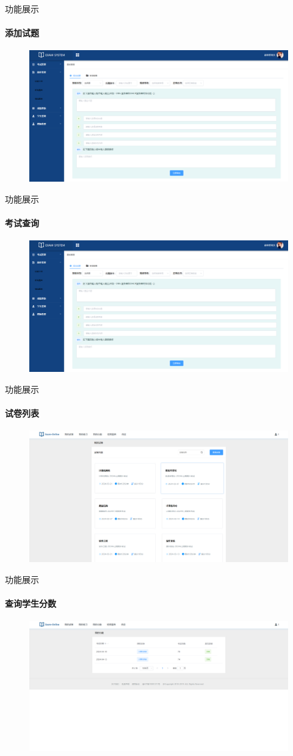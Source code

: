 \documentclass{beamer}
\begin{document}
\begin{frame}[fragile]{功能展示}
\framesubtitle{添加试题}
\begin{figure}
    \centering
    \includegraphics[width=0.75\linewidth]{2.png}
\end{figure}
\end{frame}

\begin{frame}[fragile]{功能展示}
\framesubtitle{考试查询}
\begin{figure}
    \centering
    \includegraphics[width=0.75\linewidth]{2.png}
\end{figure}
\end{frame}

\begin{frame}[fragile]{功能展示}
\framesubtitle{试卷列表}
\begin{figure}
    \centering
    \includegraphics[width=0.75\linewidth]{4.png}
\end{figure}
\end{frame}

\begin{frame}[fragile]{功能展示}
\framesubtitle{查询学生分数}
\begin{figure}
    \centering
    \includegraphics[width=0.75\linewidth]{5.png}
\end{figure}
\end{frame}

\backmatter
\end{document}
